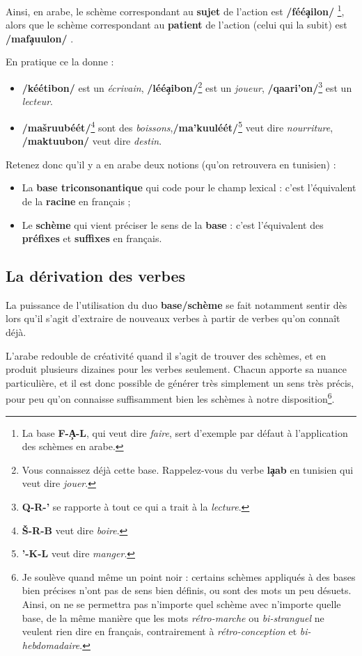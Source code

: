 Ainsi, en arabe, le schème correspondant au \textbf{sujet} de l'action est \textbf{/féé\c{a}ilon/} \footnote{La base \textbf{F-\c{A}-L}, qui veut dire \textit{faire}, sert d'exemple par défaut à l'application des schèmes en arabe.}, alors que le schème correspondant au \textbf{patient} de l'action (celui qui la subit) est \textbf{/maf\c{a}uulon/} . 

En pratique ce la donne : 

\begin{itemize}
    \item \textbf{/kéétibon/} est un \textit{écrivain}, \textbf{/léé\c{a}ibon/}\footnote{Vous connaissez déjà cette base. Rappelez-vous du verbe \textbf{l\c{a}ab} en tunisien qui veut dire \textit{jouer}.} est un \textit{joueur}, \textbf{/qaari'on/}\footnote{\textbf{Q-R-'} se rapporte à tout ce qui a trait à la \textit{lecture}.} est un \textit{lecteur}.
    \item \textbf{/ma\v{s}ruubéét/}\footnote{\textbf{\v{S}-R-B} veut dire \textit{boire}.} sont des \textit{boissons},\textbf{/ma'kuuléét/}\footnote{\textbf{'-K-L} veut dire \textit{manger}.} veut dire \textit{nourriture}, \textbf{/maktuubon/} veut dire \textit{destin}.
\end{itemize}

Retenez donc qu'il y a en arabe deux notions (qu'on retrouvera en tunisien) : 

\begin{itemize}
    \item La \textbf{base triconsonantique} qui code pour le champ lexical : c'est l'équivalent de la \textbf{racine} en français ;
    \item Le \textbf{schème} qui vient préciser le sens de la \textbf{base} : c'est l'équivalent des \textbf{préfixes} et \textbf{suffixes} en français.
\end{itemize}

\subsection{La dérivation des verbes}
La puissance de l'utilisation du duo \textbf{base/schème} se fait notamment sentir dès lors qu'il s'agit d'extraire de nouveaux verbes à partir de verbes qu'on connaît déjà.

L'arabe redouble de créativité quand il s'agit de trouver des schèmes, et en produit plusieurs dizaines pour les verbes seulement. Chacun apporte sa nuance particulière, et il est donc possible de générer très simplement un sens très précis, pour peu qu'on connaisse suffisamment bien les schèmes à notre disposition\footnote{Je soulève quand même un point noir : certains schèmes appliqués à des bases bien précises n'ont pas de sens bien définis, ou sont des mots un peu désuets. Ainsi, on ne se permettra pas n'importe quel schème avec n'importe quelle base, de la même manière que les mots \textit{rétro-marche} ou \textit{bi-stranguel} ne veulent rien dire en français, contrairement à \textit{rétro-conception} et \textit{bi-hebdomadaire}.}. 

